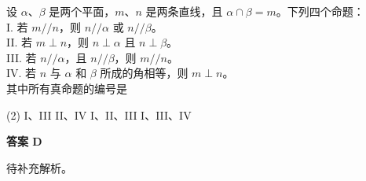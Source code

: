 \begin{choice}[source={2024年高考全国甲卷理科选择题\#10}, topic={面面交线与线面关系}]
设 $\alpha$、$\beta$ 是两个平面，$m$、$n$ 是两条直线，且 $\alpha\cap\beta=m$。下列四个命题：\\
I. 若 $m//n$，则 $n//\alpha$ 或 $n//\beta$。\\
II. 若 $m\perp n$，则 $n\perp\alpha$ 且 $n\perp\beta$。\\
III. 若 $n//\alpha$，且 $n//\beta$，则 $m//n$。\\
IV. 若 $n$ 与 $\alpha$ 和 $\beta$ 所成的角相等，则 $m\perp n$。\\
其中所有真命题的编号是
\begin{tasks}(2)
	\task I、III
	\task II、IV
	\task I、II、III
	\task I、III、IV
\end{tasks}
\end{choice}
\begin{choice-sol}
\textbf{答案 D}

待补充解析。
\end{choice-sol}
